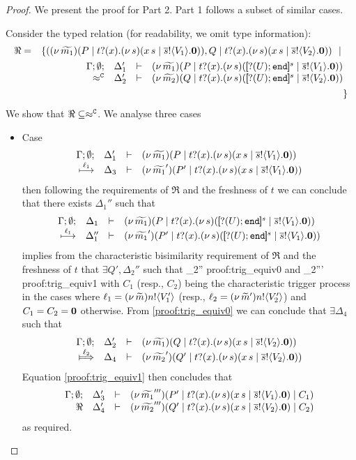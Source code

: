\begin{proof}
	We present the proof for Part 2. Part 1 follows a subset of similar cases.

	\noi Consider the typed relation (for readability, we omit type information):
	\begin{eqnarray*}
		\Re	&=&		\set{	(\newsp{\widetilde{m_1}}{P \Par \hotrigger{t}{x}{s}{V_1}},
							Q \Par \hotrigger{t}{x}{s}{V_2})
					\setbar\\
			&&			\mhorel{\Gamma}{\Delta_1'}{\newsp{\widetilde{m_1}}{P \Par \fotrigger{t}{x}{s}{\btinp{U} \tinact}{V_1}}}
						{\fwb}
						{\Delta_2'}{}{\newsp{\widetilde{m_2}}{Q \Par \fotrigger{t}{x}{s}{\btinp{U} \tinact}{V_2}}}
			\\
			&&		}
	\end{eqnarray*}
	We show that $\Re \subseteq \approx^\mathtt{C}$. We analyse three cases
	\begin{itemize}
		\item	Case
			\[
				\begin{array}{rcll} \Gamma; \emptyset; &\Delta_1'& \vdash& (\nu\, \widetilde{m_1})(P \;|\; t ? (x) . (\nu\, s)(x\, {s} \;|\; \overline{s} ! \langle V_1 \rangle . \mathbf{0}))\\ \stackrel{\ell_1}{\longmapsto} &\Delta_3& \vdash &  (\nu\, \widetilde{m_1}')(P' \;|\; t ? (x) . (\nu\, s)(x\, {s} \;|\; \overline{s} ! \langle V_1 \rangle . \mathbf{0})) \end{array}
			\]
				then following the requirements of $\Re$ and the freshness of $t$
				we can conclude that there exists $\Delta_1''$ such that
			\[
				\mhorel{\Gamma}{\Delta_1}{\newsp{\widetilde{m_1}}{P \Par \fotrigger{t}{x}{s}{\btinp{U} \tinact}{V_1}}}
				{\hby{\ell_1}}
				{\Delta_1''}{}{\newsp{\widetilde{m_1}'}{P' \Par \fotrigger{t}{x}{s}{\btinp{U} \tinact}{V_1}}}
			\]
				implies from the characteristic bisimilarity requirement of $\Re$ and
				the freshness of $t$ that $\exists Q', \Delta_2''$ such that
				{}
				{\Delta_2''}{}
				{proof:trig_equiv0}
				and
				{\fwb}
				{\Delta_2'''}{}
				{proof:trig_equiv1}
				with $C_1$ (resp., $C_2$) being the characteristic trigger process
				in the cases where $\ell_1 = (\nu\, \widetilde{m}) n ! \langle V_1' \rangle$ (resp., $\ell_2 = (\nu\, \widetilde{m}') n ! \langle V_2' \rangle$)
				and $C_1 = C_2 = \mathbf{0}$ otherwise.
				From \eqref{proof:trig_equiv0} we can conclude that $\exists \Delta_4$ such that
			\[
				\mhorel{\Gamma}{\Delta_2'}{\newsp{\widetilde{m_1}}{Q \Par \hotrigger{t}{x}{s}{V_2}}}
				{\Hby{\ell_2}}
				{\Delta_4}{}{\newsp{\widetilde{m_2}'}{Q' \Par \hotrigger{t}{x}{s}{V_2}}}
			\]
				Equation \eqref{proof:trig_equiv1} then concludes that
			\[
				\begin{array}{rcll} \Gamma; \emptyset; &\Delta_3'& \vdash& (\nu\, \widetilde{m_1}''')(P' \;|\; t ? (x) . (\nu\, s)(x\, {s} \;|\; \overline{s} ! \langle V_1 \rangle . \mathbf{0}) \;|\; C_1)\\ \Re &\Delta_4'& \vdash &  (\nu\, \widetilde{m_2}''')(Q' \;|\; t ? (x) . (\nu\, s)(x\, {s} \;|\; \overline{s} ! \langle V_2 \rangle . \mathbf{0}) \;|\; C_2) \end{array}
			\]
				as required.


\end{itemize}
\end{proof}
